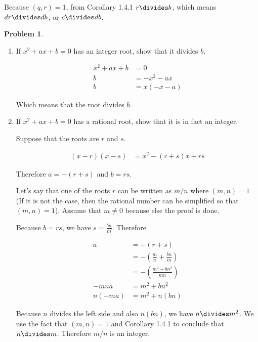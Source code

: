 \documentclass{article}
\theoremstyle{definition}
\newtheorem{problem}{Problem}[section]
\begin{document}
  Because $(q, r) = 1$, from Corollary 1.4.1 $r \divides b$, which means
  $dr \divides db$, or $c \divides db$.
  
  \begin{problem}
    ~
  \end{problem}
  
  \begin{enumerate}[label=\alph*)]
    \item If $x^2 + ax + b = 0$ has an integer root, show that it divides $b$.
    
    \begin{align*}
      x^2 + ax + b &= 0 \\
      b &= -x^2 - ax \\
      b &= x(-x - a)
    \end{align*}
    
    Which means that the root divides $b$.
    
    \item If $x^2 + ax + b = 0$ has a rational root, show that it is in fact an integer.
    
    Suppose that the roots are $r$ and $s$.
    
    \begin{align*}
      (x - r) (x - s) &= x^2 -(r + s)x + rs
    \end{align*}
    
    Therefore $a = -(r + s)$ and $b = rs$. 
    
    Let's say that one of the roots $r$
    can be written as $m/n$ where $(m, n) = 1$ (If it is not the case, then the rational number
    can be simplified so that $(m, n) = 1$). Assume that $m \neq 0$ because else the proof
    is done.
    
    Because $b = rs$, we have $s = \frac{bn}{m}$. Therefore
    
    \begin{align*}
      a &= -(r + s) \\
        &= -\left(\frac{m}{n} + \frac{bn}{m}\right) \\
        &= -\left(\frac{m^2 + bn^2}{mn}\right) \\
      -mna &= m^2 + bn^2 \\
      n(-ma) &= m^2 + n(bn)
    \end{align*}
    
    Because $n$ divides the left side and also $n(bn)$, we have $n \divides m^2$. We use
    the fact that $(m, n) = 1$ and Corollary 1.4.1 to conclude that $n \divides m$. Therefore
    $m/n$ is an integer.
    
  \end{enumerate}
  
\end{document}
